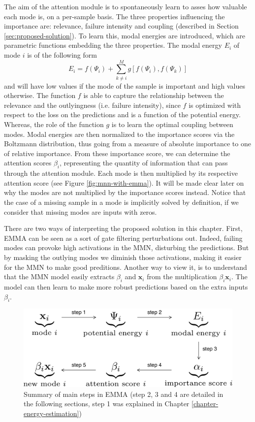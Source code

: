The aim of the attention module is to spontaneously learn to asses how valuable each mode is, on a per-sample basis. The three properties influencing the importance are: relevance, failure intensity and coupling (described in Section \ref{sec:proposed-solution}). To learn this, modal energies are introduced, which are parametric functions embedding the three properties. The modal energy $E_i$ of mode $i$ is of the following form
\begin{equation}
E_i = f(\Psi_i)  + \sum_{k\neq i}^M g[f(\Psi_i), f(\Psi_k)]
\label{eq:general-framework}
\end{equation}
and will have low values if the mode of the sample is important and high values otherwise. The function $f$ is able to capture the relationship between the relevance and the outlyingness (i.e. failure intensity), since $f$ is optimized with respect to the loss on the predictions and is a function of the potential energy. Whereas, the role of the function $g$ is to learn the optimal coupling between modes. Modal energies are then normalized to the importance scores via the Boltzmann distribution, thus going from a measure of absolute importance to one of relative importance. From these importance score, we can determine the attention scores $\beta_i$, representing the quantity of information that can pass through the attention module. Each mode is then multiplied by its respective attention score (see Figure \ref{fig:mnn-with-emma}). It will be made clear later on why the modes are not multiplied by the importance scores instead. Notice that the case of a missing sample in a mode is implicitly solved by definition, if we consider that missing modes are inputs with zeros.

There are two ways of interpreting the proposed solution in this chapter. First, EMMA can be seen as a sort of gate filtering perturbations out. Indeed, failing modes can provoke high activations in the MMN, disturbing the predictions. But by masking the outlying modes we diminish those activations, making it easier for the MMN to make good preditions. Another way to view it, is to understand that the MMN model easily extracts $\beta_i$ and $\mathbf{x}_i$ from the multiplication $\beta_i\mathbf{x}_i$. The model can then learn to make more robust predictions based on the extra inputs $\beta_i$.
\begin{figure}[!ht]
\centering
\includegraphics[scale=0.4]{figures/framework}
\caption[Summary of main steps in EMMA]{Summary of main steps in EMMA (step 2, 3 and 4 are detailed in the following sections, step 1 was explained in Chapter \ref{chapter-energy-estimation})}
\end{figure}


